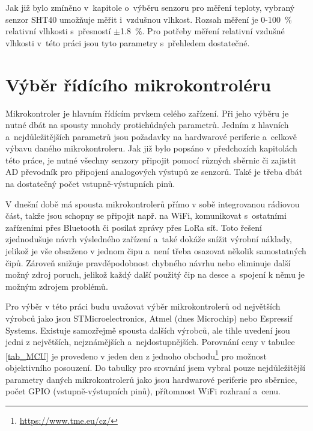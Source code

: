 Jak již bylo zmíněno v~kapitole o~výběru senzoru pro měření teploty, vybraný senzor SHT40 umožňuje měřit i~vzdušnou vlhkost. Rozsah měření je \SI{0}{}-\SI{100}{\percent} relativní vlhkosti s~přesností $\pm$\SI{1,8}{\percent}. Pro potřeby měření relativní vzdušné vlhkosti v~této práci jsou tyto parametry s~přehledem dostatečné.

\section{Výběr řídícího mikrokontroléru}

Mikrokontroler je hlavním řídícím prvkem celého zařízení. Při jeho výběru je nutné dbát na spousty mnohdy protichůdných parametrů. Jedním z hlavních a~nejdůležitějších parametrů jsou požadavky na hardwarové periferie a~celkově výbavu daného mikrokontroleru. Jak již bylo popsáno v předchozích kapitolách této práce, je nutné všechny senzory připojit pomocí různých sběrnic či zajistit AD převodník pro připojení analogových výstupů ze senzorů. Také je třeba dbát na dostatečný počet vstupně-výstupních pinů.

V dnešní době má spousta mikrokontrolerů přímo v sobě integrovanou rádiovou část, takže jsou schopny se připojit např. na WiFi, komunikovat s~ostatními zařízeními přes Bluetooth či posílat zprávy přes LoRa síť. Toto řešení zjednodušuje návrh výsledného zařízení a~také dokáže snížit výrobní náklady, jelikož je vše obsaženo v jednom čipu a~není třeba osazovat několik samostatných čipů. Zároveň snižuje pravděpodobnost chybného návrhu nebo eliminuje další možný zdroj poruch, jelikož každý další použitý čip na desce a~spojení k němu je možným zdrojem problémů.

Pro výběr v této práci budu uvažovat výběr mikrokontrolerů od největších výrobců jako jsou STMicroelectronics, Atmel (dnes Microchip) nebo Espressif Systems. Existuje samozřejmě spousta dalších výrobců, ale tihle uvedení jsou jedni z největších, nejznámějších a~nejdostupnějších. Porovnání ceny v tabulce \ref{tab_MCU} je provedeno v jeden den z jednoho obchodu\footnote{\url{https://www.tme.eu/cz/}} pro možnost objektivního posouzení. Do tabulky pro srovnání jsem vybral pouze nejdůležitější parametry daných mikrokontrolerů jako jsou hardwarové periferie pro sběrnice, počet GPIO (vstupně-výstupních pinů), přítomnost WiFi rozhraní a~cenu.

